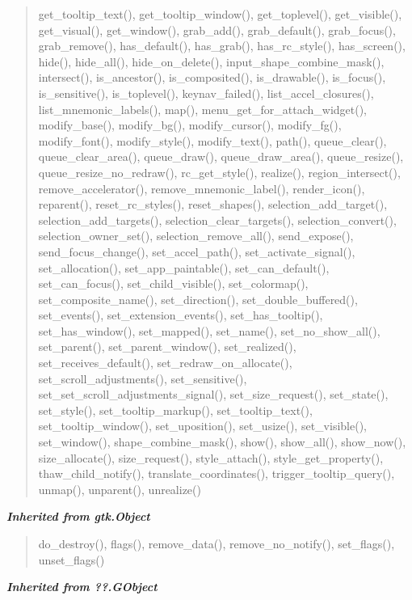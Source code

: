 \begin{quote}
get\_tooltip\_text(), get\_tooltip\_window(), get\_toplevel(), get\_visible(), get\_visual(), get\_window(), grab\_add(), grab\_default(), grab\_focus(), grab\_remove(), has\_default(), has\_grab(), has\_rc\_style(), has\_screen(), hide(), hide\_all(), hide\_on\_delete(), input\_shape\_combine\_mask(), intersect(), is\_ancestor(), is\_composited(), is\_drawable(), is\_focus(), is\_sensitive(), is\_toplevel(), keynav\_failed(), list\_accel\_closures(), list\_mnemonic\_labels(), map(), menu\_get\_for\_attach\_widget(), modify\_base(), modify\_bg(), modify\_cursor(), modify\_fg(), modify\_font(), modify\_style(), modify\_text(), path(), queue\_clear(), queue\_clear\_area(), queue\_draw(), queue\_draw\_area(), queue\_resize(), queue\_resize\_no\_redraw(), rc\_get\_style(), realize(), region\_intersect(), remove\_accelerator(), remove\_mnemonic\_label(), render\_icon(), reparent(), reset\_rc\_styles(), reset\_shapes(), selection\_add\_target(), selection\_add\_targets(), selection\_clear\_targets(), selection\_convert(), selection\_owner\_set(), selection\_remove\_all(), send\_expose(), send\_focus\_change(), set\_accel\_path(), set\_activate\_signal(), set\_allocation(), set\_app\_paintable(), set\_can\_default(), set\_can\_focus(), set\_child\_visible(), set\_colormap(), set\_composite\_name(), set\_direction(), set\_double\_buffered(), set\_events(), set\_extension\_events(), set\_has\_tooltip(), set\_has\_window(), set\_mapped(), set\_name(), set\_no\_show\_all(), set\_parent(), set\_parent\_window(), set\_realized(), set\_receives\_default(), set\_redraw\_on\_allocate(), set\_scroll\_adjustments(), set\_sensitive(), set\_set\_scroll\_adjustments\_signal(), set\_size\_request(), set\_state(), set\_style(), set\_tooltip\_markup(), set\_tooltip\_text(), set\_tooltip\_window(), set\_uposition(), set\_usize(), set\_visible(), set\_window(), shape\_combine\_mask(), show(), show\_all(), show\_now(), size\_allocate(), size\_request(), style\_attach(), style\_get\_property(), thaw\_child\_notify(), translate\_coordinates(), trigger\_tooltip\_query(), unmap(), unparent(), unrealize()
\end{quote}

\large{\textbf{\textit{Inherited from gtk.Object}}}

\begin{quote}
do\_destroy(), flags(), remove\_data(), remove\_no\_notify(), set\_flags(), unset\_flags()
\end{quote}

\large{\textbf{\textit{Inherited from ??.GObject}}}

